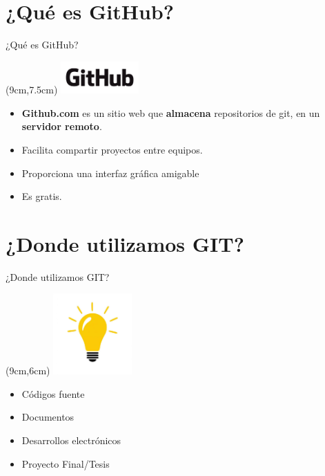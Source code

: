 \documentclass{beamer}
\begin{document}
    \section{¿Qué es GitHub?}
    \begin{frame}{¿Qué es GitHub?}
        \begin{textblock*}{3cm}(9cm,7.5cm) %
        \includegraphics[width=3cm]{GitHub_Logo.png}
        \end{textblock*}
        \begin{itemize}
            \item \textbf{Github.com} es un sitio web que \textbf{almacena} repositorios de git, en un \textbf{servidor remoto}.\pause
            \item Facilita compartir proyectos entre equipos.\pause
            \item Proporciona una interfaz gráfica amigable\pause
            \item Es gratis.
        \end{itemize}
    \end{frame}
    
    \section{¿Donde utilizamos GIT?}
    \begin{frame}{¿Donde utilizamos GIT?}
        \begin{textblock*}{3cm}(9cm,6cm) %
        \includegraphics[width=3cm]{idea.png}
        \end{textblock*}
        \pause
        \begin{itemize}
            \item Códigos fuente\pause
            \item Documentos\pause
            \item Desarrollos electrónicos\pause
            \item Proyecto Final/Tesis
        \end{itemize}
    \end{frame}
    
\end{document}
